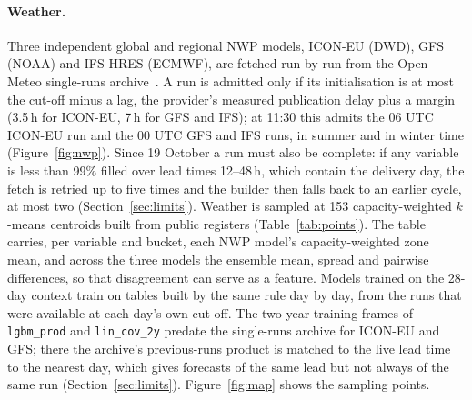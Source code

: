 \documentclass[11pt,a4paper]{article}
\newcommand{\m}[1]{\texttt{#1}}
\begin{document}
\paragraph{Weather.} Three independent global and regional NWP models, ICON-EU (DWD), GFS (NOAA) and IFS HRES (ECMWF),
are fetched run by run from the Open-Meteo single-runs archive~\cite{openmeteo}. A run is admitted only if its
initialisation is at most the cut-off minus a lag, the provider's measured publication delay plus a margin (3.5\,h for
ICON-EU, 7\,h for GFS and IFS); at 11:30 this admits the 06 UTC ICON-EU run and the 00 UTC GFS and IFS runs, in summer and in winter time
(Figure~\ref{fig:nwp}). Since 19 October a run must also be
complete: if any variable is less than 99\% filled over lead times 12--48\,h, which contain the delivery day, the fetch
is retried up to five times and the builder then falls back to an earlier cycle, at most two
(Section~\ref{sec:limits}). Weather is sampled at 153 capacity-weighted $k$-means
centroids built from public registers (Table~\ref{tab:points}).
The table carries, per variable and bucket, each NWP model's capacity-weighted zone mean, and across the
three models the ensemble mean, spread and pairwise differences, so that disagreement can serve as a feature. Models
trained on the 28-day context train on tables built by the same rule day by day, from the runs that were available at
each day's own cut-off. The two-year training frames of \m{lgbm\_prod} and \m{lin\_cov\_2y} predate the single-runs
archive for ICON-EU and GFS; there the archive's previous-runs product is matched to the live lead time to the nearest
day, which gives forecasts of the same lead but not always of the same run (Section~\ref{sec:limits}). Figure~\ref{fig:map} shows the sampling points.
\end{document}
